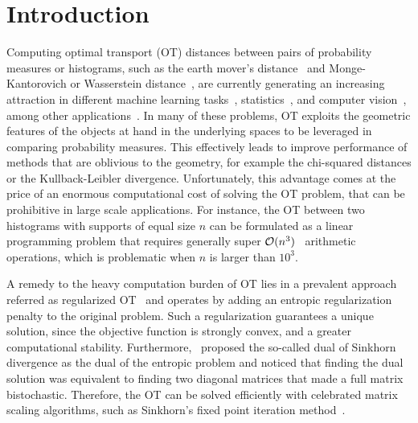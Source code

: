 
\section{Introduction} %
\label{sec:introduction}

Computing optimal transport (OT) distances between pairs of probability measures or histograms, such as the earth mover's distance~\citep{werman1985,Rubner2000} and Monge-Kantorovich or Wasserstein distance~\citep{villani09optimal}, are currently generating an increasing attraction in different machine learning tasks~\citep{pmlr-v32-solomon14,kusnerb2015,pmlr-v70-arjovsky17a,ho2017}, statistics~\citep{frogner2015nips,panaretos2016,ebert2017ConstructionON,bigot2017,flamary2018WDA}, and computer vision~\citep{bonnel2011,Rubner2000,solomon2015}, among other applications~\citep{klouri17,peyre2019COTnowpublisher}.
In many of these problems, OT exploits the geometric features of the objects at hand in the underlying spaces to be leveraged in comparing probability measures.
This effectively leads to improve performance of methods that are oblivious to the geometry, for example the chi-squared distances or the Kullback-Leibler divergence.
Unfortunately, this advantage comes at the price of an enormous computational cost of solving the OT problem, that can be prohibitive in large scale applications.
For instance, the OT between two histograms with supports of equal size $n$ can be formulated as a linear programming problem that requires generally super $\mathcal{O}(n^3)$~\citep{pele2009} arithmetic operations, which is problematic when $n$ is larger than $10^3.$

A remedy to the heavy computation burden of OT lies in a prevalent approach referred as regularized OT~\citep{cuturinips13} and operates by adding an entropic regularization penalty to the original problem.  
Such a regularization guarantees a unique solution, since the objective function is strongly convex, and a greater computational stability.
Furthermore,~\citet{cuturinips13} proposed the so-called {dual of Sinkhorn divergence} as the dual of the entropic problem and noticed that finding the dual solution was equivalent to finding two diagonal matrices that made a full matrix bistochastic.
Therefore, the OT can be solved efficiently with celebrated matrix scaling algorithms, such as Sinkhorn's fixed point iteration method~\citep{sinkhorn1967,knight2008,kalantari2008}. 

